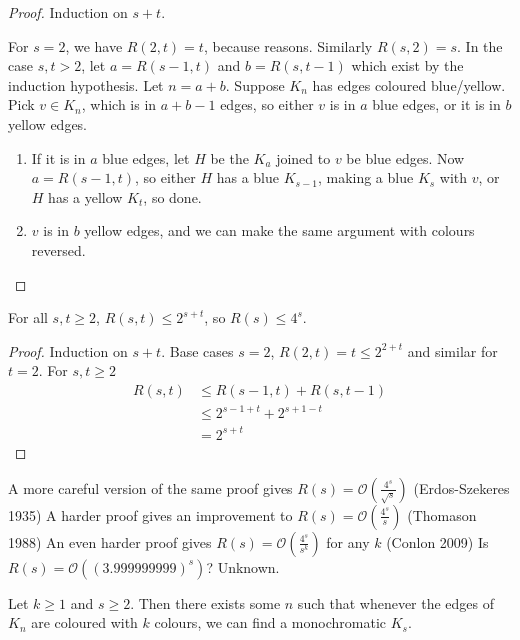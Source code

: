 \documentclass{article}
\begin{document}
\begin{proof}
    Induction on $s+t$.

    For $s=2$, we have $R(2, t) = t$, because reasons.  Similarly $R(s, 2) = s$.
    In the case $s, t > 2$, let $a = R(s-1, t)$ and $b = R(s, t-1)$ which exist by the induction hypothesis.  Let $n = a+b$. Suppose $K_n$ has edges coloured blue/yellow.
    Pick $v \in K_n$, which is in $a+b-1$ edges, so either $v$ is in $a$ blue edges, or it is in $b$ yellow edges.
    \begin{enumerate}
        \item If it is in $a$ blue edges, let $H$ be the $K_a$ joined to $v$ be blue edges.  Now $a = R(s-1, t)$, so either $H$ has a blue $K_{s-1}$, making a blue $K_s$ with $v$, or $H$ has a yellow $K_t$, so done.
        \item $v$ is in $b$ yellow edges, and we can make the same argument with colours reversed.
    \end{enumerate}
\end{proof}

\begin{ncor}
    For all $s, t \geq 2$, $R(s, t) \leq 2^{s+t}$, so $R(s) \leq 4^s$.
\end{ncor}

\begin{proof}
    Induction on $s + t$.  Base cases $s=2$, $R(2, t) = t \leq 2^{2+t}$ and similar for $t=2$.
    For $s, t \geq 2$
    \begin{align}
        R(s, t) &\leq R(s-1, t) + R(s, t-1) \\
                &\leq 2^{s-1+t} + 2^{s+1-t} \\
                &= 2^{s+t}
    \end{align}
\end{proof}

A more careful version of the same proof gives $R(s) = \mathcal{O} (\frac{4^s}{\sqrt{s}})$ (Erdos-Szekeres 1935)
A harder proof gives an improvement to $R(s) = \mathcal{O}(\frac{4^s}{s})$ (Thomason 1988)
An even harder proof gives $R(s) = \mathcal{O}(\frac{4^s}{s^k})$ for any $k$ (Conlon 2009)
Is $R(s) = \mathcal{O}((3.999999999)^s)$? Unknown.

\begin{nthm}
    Let $k \geq 1$ and $s \geq 2$. Then there exists some $n$ such that whenever the edges of $K_n$ are coloured with $k$ colours, we can find a monochromatic $K_s$.
\end{nthm}
\end{document}

